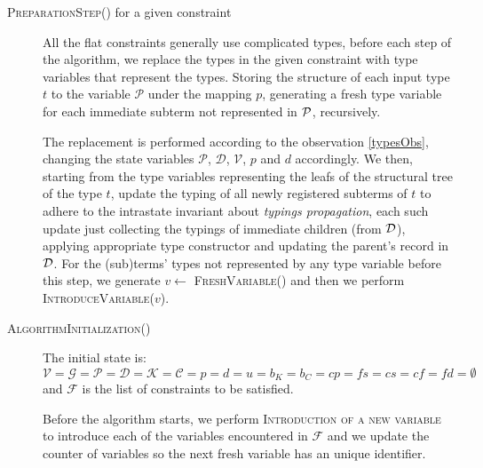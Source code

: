 \begin{description}
    \item[\textsc{PreparationStep()} for a given constraint] All the flat constraints generally use complicated types, before each step of the algorithm, we replace the types in the given constraint with type variables that represent the types. Storing the structure of each input type $t$ to the variable $\mathcal P$ under the mapping $p$, generating a fresh type variable for each immediate subterm not represented in $\mathcal P$, recursively.

    The replacement is performed according to the observation \ref{typesObs}, changing the state variables $\mathcal{P}$, $\mathcal{D}$, $\mathcal{V}$, $p$ and $d$ accordingly. We then, starting from the type variables representing the leafs of the structural tree of the type $t$, update the typing of all newly registered subterms of $t$ to adhere to the intrastate invariant about \emph{typings propagation}, each such update just collecting the typings of immediate children (from $\mathcal D$), applying appropriate type constructor and updating the parent's record in $\mathcal D$. For the (sub)terms' types not represented by any type variable before this step, we generate $v \gets $ \textsc{FreshVariable()} and then we perform \textsc{IntroduceVariable($v$)}.

    \item[\textsc{AlgorithmInitialization()}] The initial state is: $\mathcal{V} = \mathcal{G} = \mathcal{P} = \mathcal{D} = \mathcal{K} = \mathcal{C} = p = d = u = b_K = b_C = cp = fs = cs = cf = fd = \emptyset$ and $\mathcal{F}$ is the list of constraints to be satisfied.

    Before the algorithm starts, we perform \textsc{Introduction of a new variable} to introduce each of the variables encountered in $\mathcal{F}$ and we update the counter of variables so the next fresh variable has an unique identifier.
\end{description}



